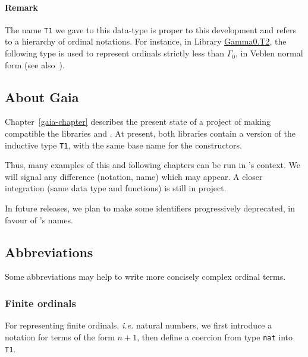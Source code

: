 \paragraph{Remark}
The name \texttt{T1} we gave to this data-type  is proper to this development and refers
to a hierarchy of ordinal notations. For instance, in Library \href{../theories/html/hydras.Gamma0.T2.html}{Gamma0.T2},  the following type is used to represent ordinals strictly less than \(\Gamma_0\),  in Veblen normal form (see also~\cite{schutte}).
\noindent




\subsection{About Gaia}
\gaiasign Chapter~\vref{gaia-chapter} describes the present state of a
project of making compatible the libraries \HydrasLib and \gaia. At present, both libraries contain a version of the inductive type \texttt{T1}, with the same base name for the constructors.


Thus, many examples of this and following chapters can be run
in \gaia's context. We will signal any difference (notation, name) which may appear.
A closer integration (same data type and functions) is still in project.

\begin{remark}
  \label{remark:hydra-gaia-renaming}
  \textcolor{lookcolor}{In future releases, we plan to make some
    \HydrasLib identifiers progressively  deprecated, in favour of \gaia's names.}
\end{remark}



\subsection{Abbreviations}

Some abbreviations may help to write more concisely complex ordinal terms.

\subsubsection{Finite ordinals}
\label{sec:orgheadline67}

For representing finite ordinals, \emph{i.e.} natural numbers, we first introduce a notation for terms of the form $n+1$, then define a coercion from type \texttt{nat} into \texttt{T1}.
\label{sect:notation-FS}

